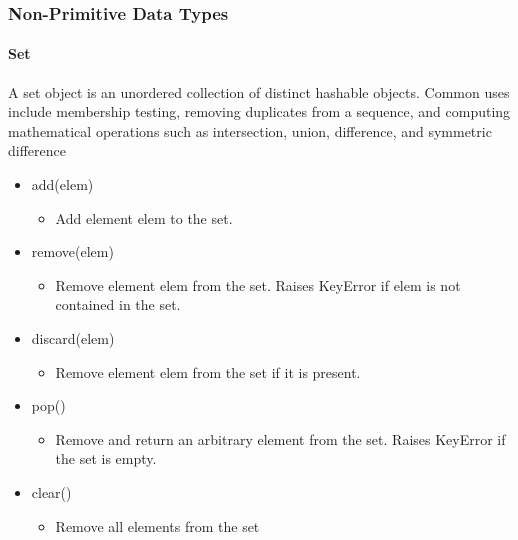 \documentclass{beamer}
\begin{document}
\begin{frame}[fragile]
\frametitle{Non-Primitive Data Types}
\framesubtitle{Set}
A set object is an unordered collection of distinct hashable objects. Common uses include membership testing, removing duplicates from a sequence, and computing mathematical operations such as intersection, union, difference, and symmetric difference
\begin{itemize}
	\item add(elem)
		\begin{itemize}
		\item Add element elem to the set.
		\end{itemize}

	\item remove(elem)
		\begin{itemize}
		\item Remove element elem from the set. Raises KeyError if elem is not contained in the set.
		\end{itemize}

	\item discard(elem)
		\begin{itemize}
		\item Remove element elem from the set if it is present.
		\end{itemize}
	
	\item pop()
		\begin{itemize}
		\item Remove and return an arbitrary element from the set. Raises KeyError if the set is empty.
		\end{itemize}
		
	\item clear()
		\begin{itemize}
		\item Remove all elements from the set
		\end{itemize}
\end{itemize}


\end{frame}
\end{document}
